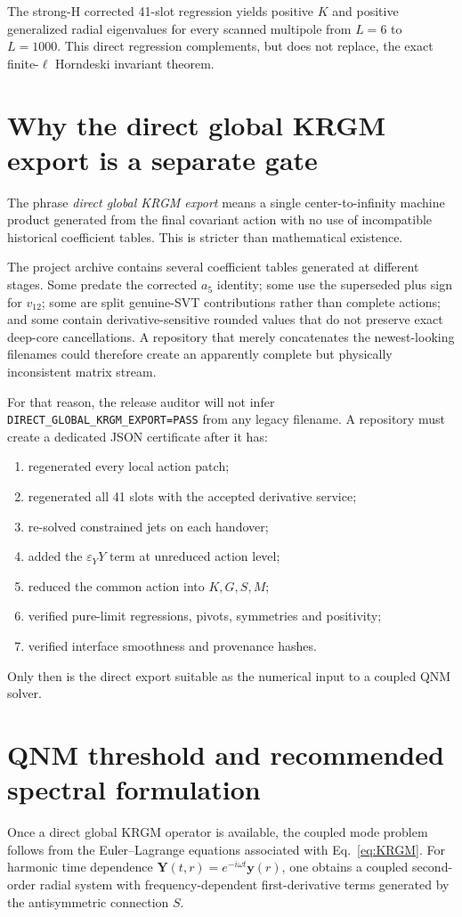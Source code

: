 \documentclass[11pt,a4paper,oneside]{book}
\newcommand{\epsY}{\varepsilon_Y}
\begin{document}
The strong-H corrected 41-slot regression yields positive $K$ and positive generalized radial eigenvalues for every scanned multipole from $L=6$ to $L=1000$. This direct regression complements, but does not replace, the exact finite-$\ell$ Horndeski invariant theorem.

\chapter{Why the direct global KRGM export is a separate gate}
The phrase \emph{direct global KRGM export} means a single center-to-infinity machine product generated from the final covariant action with no use of incompatible historical coefficient tables. This is stricter than mathematical existence.

The project archive contains several coefficient tables generated at different stages. Some predate the corrected $a_5$ identity; some use the superseded plus sign for $v_{12}$; some are split genuine-SVT contributions rather than complete actions; and some contain derivative-sensitive rounded values that do not preserve exact deep-core cancellations. A repository that merely concatenates the newest-looking filenames could therefore create an apparently complete but physically inconsistent matrix stream.

For that reason, the release auditor will not infer \texttt{DIRECT\_GLOBAL\_KRGM\_EXPORT=PASS} from any legacy filename. A repository must create a dedicated JSON certificate after it has:
\begin{enumerate}
\item regenerated every local action patch;
\item regenerated all 41 slots with the accepted derivative service;
\item re-solved constrained jets on each handover;
\item added the $\epsY Y$ term at unreduced action level;
\item reduced the common action into $K,G,S,M$;
\item verified pure-limit regressions, pivots, symmetries and positivity;
\item verified interface smoothness and provenance hashes.
\end{enumerate}
Only then is the direct export suitable as the numerical input to a coupled QNM solver.

\chapter{QNM threshold and recommended spectral formulation}
Once a direct global KRGM operator is available, the coupled mode problem follows from the Euler--Lagrange equations associated with Eq.~\eqref{eq:KRGM}. For harmonic time dependence $\bm Y(t,r)=e^{-i\omega t}\bm y(r)$, one obtains a coupled second-order radial system with frequency-dependent first-derivative terms generated by the antisymmetric connection $S$.
\end{document}
